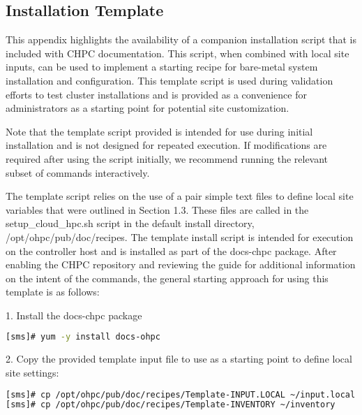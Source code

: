 \renewcommand\thesubsection{\Alph{subsection}}
\subsection{Installation Template}

This appendix highlights the availability of a companion installation script that is included with CHPC documentation. This script, when combined with local site inputs, can be used to implement a starting
recipe for bare-metal system installation and configuration. This template script is used during validation efforts to test cluster installations and is provided as a convenience for administrators as a starting point for potential site customization.
\begin{center}
	\begin{tcolorbox}[]
		\small
Note that the template script provided is intended for use during initial installation and is not designed for
repeated execution. If modifications are required after using the script initially, we recommend running the
relevant subset of commands interactively.
\end{tcolorbox}
\end{center}
The template script relies on the use of a pair simple text files to define local site variables that were outlined
in Section 1.3. These files are called in the setup\_cloud\_hpc.sh script in the default install directory, /opt/ohpc/pub/doc/recipes.
The template install script is intended for
execution on the controller host and is installed as part of the docs-chpc package. After enabling the CHPC repository and reviewing the guide for additional information on the intent of the commands, the general starting approach for using this template
is as follows:


1. Install the docs-chpc package

\begin{lstlisting}[language=bash,keywords={},upquote=true]
[sms]# yum -y install docs-ohpc
\end{lstlisting}

2. Copy the provided template input file to use as a starting point to define local site settings:

\begin{lstlisting}[language=bash,keywords={},upquote=true]
[sms]# cp /opt/ohpc/pub/doc/recipes/Template-INPUT.LOCAL ~/input.local
[sms]# cp /opt/ohpc/pub/doc/recipes/Template-INVENTORY ~/inventory
\end{lstlisting}

